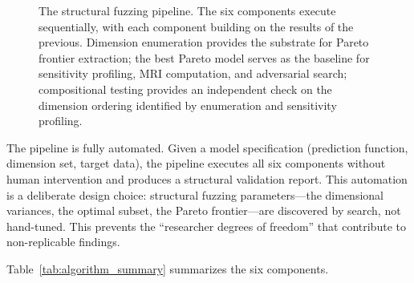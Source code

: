 \documentclass[12pt]{article}
\begin{document}
\begin{figure}[H]
\centering
{}
\caption{The structural fuzzing pipeline.  The six components execute sequentially, with each component building on the results of the previous.  Dimension enumeration provides the substrate for Pareto frontier extraction; the best Pareto model serves as the baseline for sensitivity profiling, MRI computation, and adversarial search; compositional testing provides an independent check on the dimension ordering identified by enumeration and sensitivity profiling.}
\label{fig:pipeline}
\end{figure}

The pipeline is fully automated.  Given a model specification (prediction function, dimension set, target data), the pipeline executes all six components without human intervention and produces a structural validation report.  This automation is a deliberate design choice: structural fuzzing parameters---the dimensional variances, the optimal subset, the Pareto frontier---are discovered by search, not hand-tuned.  This prevents the ``researcher degrees of freedom'' \cite{simmons2011} that contribute to non-replicable findings.

Table~\ref{tab:algorithm_summary} summarizes the six components.
\end{document}
